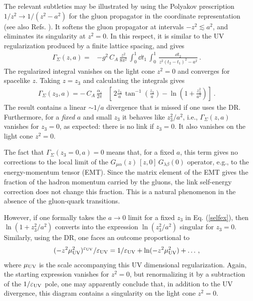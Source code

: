 The relevant subtleties may be illustrated by using the Polyakov prescription
\mbox{$1/z^2 \to 1/(z^2-a^2)$} for the gluon propagator in the coordinate representation \cite{Polyakov:1980ca}
(see also Refs. \cite{Chen:2016fxx,Radyushkin:2017lvu}).
It
softens the gluon propagator at intervals $-z^2 \lesssim a^2$,
and eliminates its singularity at $z^2=0$. In this respect,
it is similar to the UV regularization produced by a finite lattice spacing, and gives
\begin{align}
\Gamma_ \Sigma (z,a) = & - g^2\,C_A \,\frac{z^2}{8 \pi^2}
\, \int_0^1 \dd t_1 \, \int_0^1 \, \frac{\dd t_2}{ z^2 (t_2-t_1)^2 - a^2} \ .
\label{selfa}
\end{align}
The regularized integral vanishes
on the light cone \mbox{$z^2=0$} and converges for spacelike $z$.
Taking $z=z_3$ and
calculating the integrals gives \cite{Chen:2016fxx,Radyushkin:2017lvu}
\begin{align}
\Gamma_\Sigma (z_3,a) = -\,C_A \,\frac{\alpha_s}{2 \pi}
&
\left [
\,
2 \frac{z_3}{a} \, \tan
^{-1}\left(\frac{z_3}{a}\right) - \ln
\left(1+ \frac{z_3^2}{a^2}\right) \right ] \ .
\label{selfex}
\end{align}
The result contains a linear $\sim 1/a$ divergence that is
missed if one uses the DR. Furthermore,
for a {\it fixed} $a$ and small $z_3$ it behaves
like $z_3^2/a^2$, i.e., $\Gamma_\Sigma (z,a)$ vanishes for $z_3=0$, as expected: there is no link if $z_3=0$.
It also vanishes on the light cone $z^2=0$.

The fact that $\Gamma_\Sigma (z_3=0,a) =0$ means that,
for a fixed $a$,
this term gives no corrections to
the local limit of the $G_{\mu \alpha} (z) \, [z,0]\, G_{\lambda \beta} (0)$
operator, e.g., to
the energy-momentum tensor (EMT).
Since the matrix element
of the EMT gives the fraction of the hadron momentum carried by the gluons,
the link self-energy correction does not change this fraction. This is a natural
phenomenon in the absence of
the gluon-quark transitions.

However, if one formally takes the $a\to 0$ limit for a fixed $z_3$ in Eq. (\ref{selfex}),
then $\ln \left(1+{z_3^2}/{a^2}\right)$ converts into the expression
$\ln \left({z_3^2}/{a^2}\right)$ singular for $z_3=0$.
Similarly, using the DR, one faces an outcome proportional to
\begin{align}
(-z^2\mu_{\rm UV}^2)^{\varepsilon_{\rm UV}}/\varepsilon_{\rm UV}= 1/\varepsilon_{\rm UV} + \ln (-z^2 \mu_{\rm UV}^2) + \ldots \, ,
\end{align}
where $\mu_{\rm UV}$ is the scale accompanying this UV dimensional regularization.
Again, the starting expression vanishes for $z^2=0$, but
renormalizing it by a subtraction of the $1/\varepsilon_{\rm UV}$ pole,
one may apparently conclude that, in addition to the UV divergence, this diagram
contains a singularity on the light cone $z^2=0$.

